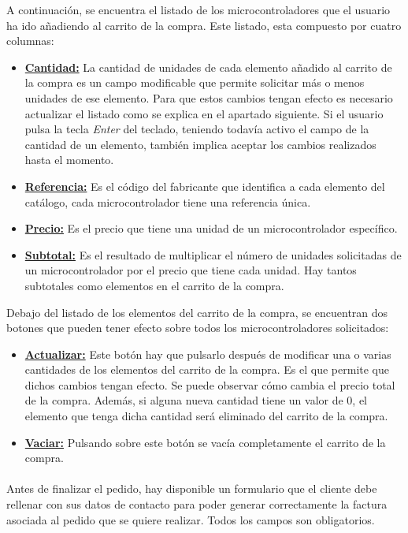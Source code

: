 A continuación, se encuentra el listado de los microcontroladores que el usuario ha ido añadiendo al carrito de la compra. Este listado, esta compuesto por cuatro columnas: 
\begin{itemize}
	\item \underline{\textbf{Cantidad:}} La cantidad de unidades de cada elemento añadido al carrito de la compra es un campo modificable que permite	solicitar más o menos unidades de ese elemento. Para que estos cambios tengan efecto es necesario actualizar el listado como se explica en el apartado siguiente. Si el usuario pulsa la tecla \textit{Enter} del teclado, teniendo todavía activo el campo de la cantidad de un elemento, también implica aceptar los cambios realizados hasta el momento.
	
	\item \underline{\textbf{Referencia:}} Es el código del fabricante que identifica a cada elemento del catálogo, cada microcontrolador
	tiene una referencia única.
	
	\item \underline{\textbf{Precio:}} Es el precio que tiene una unidad de un microcontrolador específico.

	\item \underline{\textbf{Subtotal:}} Es el resultado de multiplicar el número de unidades solicitadas de un microcontrolador por el precio que tiene cada unidad. Hay tantos subtotales como elementos en el carrito de la compra.
\end{itemize}

Debajo del listado de los elementos del carrito de la compra, se encuentran dos botones que pueden tener efecto sobre todos los microcontroladores solicitados:
\begin{itemize}
	\item \underline{\textbf{Actualizar:}}  Este botón hay que pulsarlo después de modificar una o varias cantidades de los elementos del 
	carrito de la compra. Es el que permite que dichos cambios tengan efecto. Se puede observar cómo cambia el precio total de la compra.
	Además, si alguna nueva cantidad tiene un valor de 0, el elemento que tenga dicha cantidad será eliminado del carrito de la compra.
	
	\item \underline{\textbf{Vaciar:}}  Pulsando sobre este botón se vacía completamente el carrito de la compra.
\end{itemize}

\paragraph{}Antes de finalizar el pedido, hay disponible un formulario que el cliente debe rellenar con sus datos de contacto para poder generar correctamente la factura asociada al pedido que se quiere realizar. Todos los campos son obligatorios.

